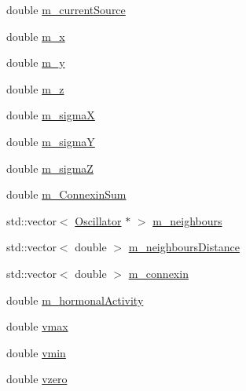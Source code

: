 \begin{DoxyCompactItemize}
\item 
double \hyperlink{class_oscillator_a766694982f9a1f8ed7013828089587f7}{m\+\_\+current\+Source}
\item 
double \hyperlink{class_oscillator_abd8b2a7267f85cae787a0bc77d1f5a5a}{m\+\_\+x}
\item 
double \hyperlink{class_oscillator_a6936c789a75680f0486c817af4fce202}{m\+\_\+y}
\item 
double \hyperlink{class_oscillator_ae00491a4783797fb6edb9c3d5317a6ad}{m\+\_\+z}
\item 
double \hyperlink{class_oscillator_aa0fe6259ca35433e3bd0dbac2d0ead65}{m\+\_\+sigma\+X}
\item 
double \hyperlink{class_oscillator_a253c7652df4789833c9f940c3278036d}{m\+\_\+sigma\+Y}
\item 
double \hyperlink{class_oscillator_af8ba90eb71c73ac1c789d569e7e2f92f}{m\+\_\+sigma\+Z}
\item 
double \hyperlink{class_oscillator_a952e781ffe848b06b7b511c54f1d090c}{m\+\_\+\+Connexin\+Sum}
\item 
std\+::vector$<$ \hyperlink{class_oscillator}{Oscillator} $\ast$ $>$ \hyperlink{class_oscillator_ac6add7bad19c62071ad1ce651b815e4e}{m\+\_\+neighbours}
\item 
std\+::vector$<$ double $>$ \hyperlink{class_oscillator_a7031173912bc2225997a3ab6f9995fec}{m\+\_\+neighbours\+Distance}
\item 
std\+::vector$<$ double $>$ \hyperlink{class_oscillator_a94d86971a2a425d2e2492962491dc01b}{m\+\_\+connexin}
\item 
double \hyperlink{class_oscillator_a80a2b0beda0d17f549160fbbd456243b}{m\+\_\+hormonal\+Activity}
\item 
double \hyperlink{class_oscillator_a43006eaf9a5a3b50a8f6a2a95ce47231}{vmax}
\item 
double \hyperlink{class_oscillator_a8912b5faff383dcc1a33554d2bcc5844}{vmin}
\item 
double \hyperlink{class_oscillator_af6886099dfca8ec732676f4f89935651}{vzero}
\end{DoxyCompactItemize}


